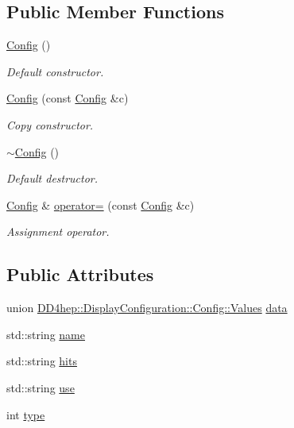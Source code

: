\subsection*{Public Member Functions}
\begin{DoxyCompactItemize}
\item 
\hyperlink{class_d_d4hep_1_1_display_configuration_1_1_config_ae8da46c00b3e85bc7c2a247175216bbc}{Config} ()
\begin{DoxyCompactList}\small\item\em Default constructor. \end{DoxyCompactList}\item 
\hyperlink{class_d_d4hep_1_1_display_configuration_1_1_config_ab5d7a0d2cf59ed2ca47afabd66fd2918}{Config} (const \hyperlink{class_d_d4hep_1_1_display_configuration_1_1_config}{Config} \&c)
\begin{DoxyCompactList}\small\item\em Copy constructor. \end{DoxyCompactList}\item 
\hyperlink{class_d_d4hep_1_1_display_configuration_1_1_config_a3ae52820778d8b7cdf70518bc1504c8f}{$\sim$\+Config} ()
\begin{DoxyCompactList}\small\item\em Default destructor. \end{DoxyCompactList}\item 
\hyperlink{class_d_d4hep_1_1_display_configuration_1_1_config}{Config} \& \hyperlink{class_d_d4hep_1_1_display_configuration_1_1_config_a4fd5de82887e43ea1a99204c73e13c47}{operator=} (const \hyperlink{class_d_d4hep_1_1_display_configuration_1_1_config}{Config} \&c)
\begin{DoxyCompactList}\small\item\em Assignment operator. \end{DoxyCompactList}\end{DoxyCompactItemize}
\subsection*{Public Attributes}
\begin{DoxyCompactItemize}
\item 
union \hyperlink{union_d_d4hep_1_1_display_configuration_1_1_config_1_1_values}{D\+D4hep\+::\+Display\+Configuration\+::\+Config\+::\+Values} \hyperlink{class_d_d4hep_1_1_display_configuration_1_1_config_aae403badb7228f69c1f7fecb726e6a99}{data}
\item 
std\+::string \hyperlink{class_d_d4hep_1_1_display_configuration_1_1_config_adefaa09fe7cde3bb7330de97cf07a1ba}{name}
\item 
std\+::string \hyperlink{class_d_d4hep_1_1_display_configuration_1_1_config_af16ac4baf6e5e53a8ee3c971f74a5686}{hits}
\item 
std\+::string \hyperlink{class_d_d4hep_1_1_display_configuration_1_1_config_a2b092695528d45417dfeeb376993d5cb}{use}
\item 
int \hyperlink{class_d_d4hep_1_1_display_configuration_1_1_config_a39e4104003d0a6fe90053120cc97fd60}{type}
\end{DoxyCompactItemize}


